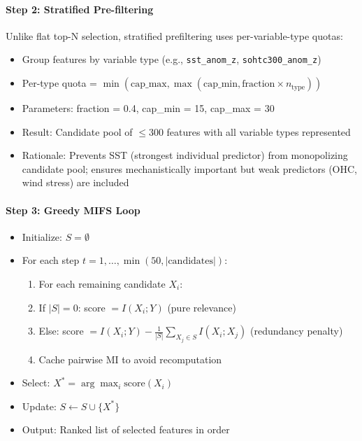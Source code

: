 \documentclass[12pt,a4paper]{article}
\begin{document}
\paragraph{Step 2: Stratified Pre-filtering}
Unlike flat top-N selection, stratified prefiltering uses per-variable-type quotas:
\begin{itemize}
    \item Group features by variable type (e.g., \texttt{sst\_anom\_z}, \texttt{sohtc300\_anom\_z})
    \item Per-type quota = $\min(\text{cap\_max}, \max(\text{cap\_min}, \text{fraction} \times n_{\text{type}}))$
    \item Parameters: fraction = 0.4, cap\_min = 15, cap\_max = 30
    \item Result: Candidate pool of $\leq 300$ features with all variable types represented
    \item Rationale: Prevents SST (strongest individual predictor) from monopolizing candidate pool; ensures mechanistically important but weak predictors (OHC, wind stress) are included
\end{itemize}

\paragraph{Step 3: Greedy MIFS Loop}
\begin{itemize}
    \item Initialize: $S = \emptyset$
    \item For each step $t = 1, \ldots, \min(50, |\text{candidates}|)$:
    \begin{enumerate}
        \item For each remaining candidate $X_i$:
        \item If $|S| = 0$: score $= I(X_i; Y)$ (pure relevance)
        \item Else: score $= I(X_i; Y) - \frac{1}{|S|} \sum_{X_j \in S} I(X_i; X_j)$ (redundancy penalty)
        \item Cache pairwise MI to avoid recomputation
    \end{enumerate}
    \item Select: $X^* = \arg\max_i \text{score}(X_i)$
    \item Update: $S \leftarrow S \cup \{X^*\}$
    \item Output: Ranked list of selected features in order
\end{itemize}
\end{document}
